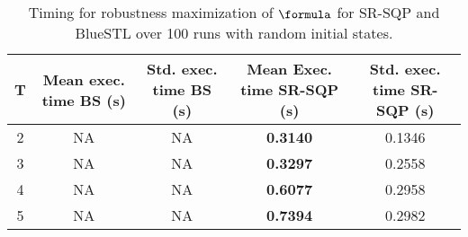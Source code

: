 \begin{table}[htb]
\small
\begin{center}
\caption{{\small Timing for robustness maximization of $\formula$ for SR-SQP and BlueSTL over 100 runs with random initial states.}}
\vspace{-10pt}
\label{tbl:opt_performance}
\begin{tabular} {|c|c|c|c|c|}
	\hline
	\textbf{T} & Mean exec. time BS (s) & Std. exec. time BS (s) &  Mean Exec. time SR-SQP (s) & Std. exec. time SR-SQP (s)\\ \hline
	2 & NA & NA & \textbf{0.3140} & 0.1346 \\ \hline
	3 & NA & NA & \textbf{0.3297} & 0.2558\\ \hline
	4 & NA & NA  & \textbf{0.6077} & 0.2958\\ \hline
	5 & NA & NA  & \textbf{0.7394} & 0.2982\\ \hline
\end{tabular}	
\end{center}
\vspace{-20pt}
\end{table}

